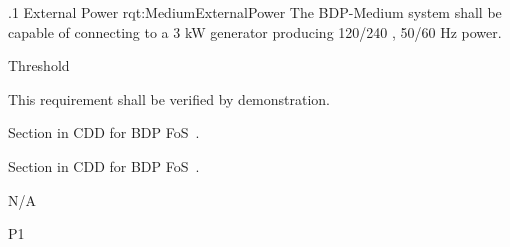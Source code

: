 

\ONERQMTVKSA
{\RqtNumberBase.1}
{External Power}
{rqt:MediumExternalPower}
{The BDP-Medium system shall be capable of connecting to a 3 kW generator producing 120/240 \VAC, 50/60 Hz power.}
{
	\item [Phase 1] Threshold
}
{This requirement shall be verified by demonstration.}
{
\item [5.5.9] Section in CDD for BDP FoS~\cite{ref__BDP_FOS_CDD}.
\item [5.5.10.2] Section in CDD for BDP FoS~\cite{ref__BDP_FOS_CDD}.
}
{
	\item N/A
}
{P1}
